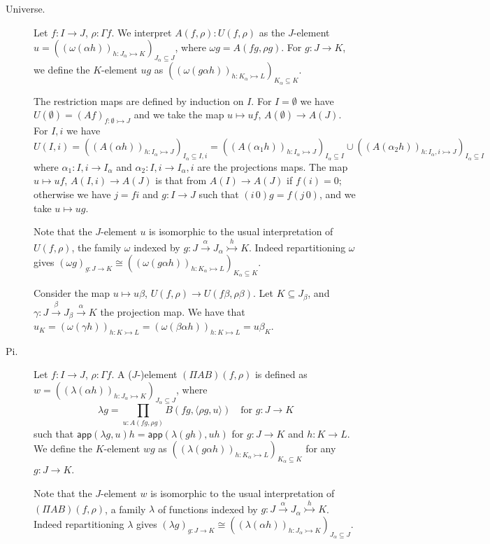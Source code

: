 \documentclass[english]{PaperTools/latex/lipics}
\def\app#1#2{\mathsf{app}(#1,#2)}
\begin{document}
\bigskip
\begin{description}
  \item[\sc Universe.]
    Let $f : I → J$, $ρ : Γf$.  We interpret $A(f,ρ) : U(f,ρ)$ as the
    $J$-element $u = \left(\left(ω(αh)\right)_{h : J_α ↣ K}\right)_{J_α ⊆ J}$,
    where $ωg = A(fg,ρg)$.
    For $g : J → K$, we define the $K$-element $u g$ as
    $\left(\left(ω(gαh)\right)_{h : K_α ↣ L}\right)_{K_α ⊆ K}$.

    The restriction maps are defined by induction on $I$.
    For $I = ∅$ we have $U(∅) = (Af)_{f:∅ ↣ J}$ and we take the map
    $u ↦ uf$, $A(∅) → A(J)$.
    For $I,i$ we have $U(I,i) = \left(\left(A(αh)\right)_{h : I_α ↣ J}\right)_{I_α ⊆ I,i}
    = \left(\left(A(α_1h)\right)_{h : I_α ↣ J}\right)_{I_α ⊆ I} ∪
      \left(\left(A(α_2h)\right)_{h : I_α,i ↣ J}\right)_{I_α ⊆ I}$
    where $α_1 : I,i → I_α$ and $α_2 : I,i → I_α,i$ are the projections
    maps.
    The map $u ↦ uf$, $A(I,i) → A(J)$ is
    that from $A(I) → A(J)$ if $f(i) = 0$; otherwise
    we have $j = fi$ and $g : I→J$ such that $(i\,0)g = f(j\,0)$, and we
    take $u ↦ ug$.

    Note that the $J$-element $u$ is isomorphic to the usual interpretation of
    $U(f,ρ)$, the family $ω$ indexed by $g : J \stackrel{α}{→} J_α \stackrel {h}{↣} K$.
    Indeed repartitioning $ω$ gives
    $\left(ωg\right)_{g : J → K} ≅ \left(\left(ω(gαh)\right)_{h : K_α ↣ L}\right)_{K_α ⊆ K}$.

    Consider the map $u ↦ uβ$, $U(f,ρ) → U(fβ,ρβ)$.  Let
    $K ⊆ J_β$, and $γ : J \stackrel{β}{→} J_β \stackrel{α}{→} K$ the projection map.
    We have that
    $u_K = \left(ω(γh)\right)_{h : K ↣ L}
         = \left(ω(βαh)\right)_{h : K ↣ L}
         = uβ_K$.

  \item[\sc Pi.]
    Let $f : I → J$, $ρ : Γf$.  A ($J$-)element $(Π A B)(f,ρ)$ is defined as
    $w = \left(\left(λ(αh)\right)_{h : J_α ↣ K}\right)_{J_α ⊆ J}$,
    where
    $$λ g = \prod_{u : A(fg,ρg)} B(fg,⟨ρg,u⟩) \quad\text{for $g : J → K$}$$
    such that
    $\app{λg} u h = \app{λ(gh)}{uh}$ for $g : J → K$ and $h : K → L$.
    We define the $K$-element $w g$ as
    $\left(\left(λ(gαh)\right)_{h : K_α ↣ L}\right)_{K_α ⊆ K}$ for any $g : J → K$.

    Note that the $J$-element $w$ is isomorphic to the usual interpretation
    of $(ΠAB)(f,ρ)$, a family $λ$ of functions indexed by
    $g : J \stackrel{α}{→} J_α \stackrel {h}{↣} K$.  Indeed repartitioning $λ$ gives
    $\left(λg\right)_{g : J → K} ≅ \left(\left(λ(αh)\right)_{h : J_α ↣ K}\right)_{J_α ⊆ J}$.


\end{description}
\end{document}
